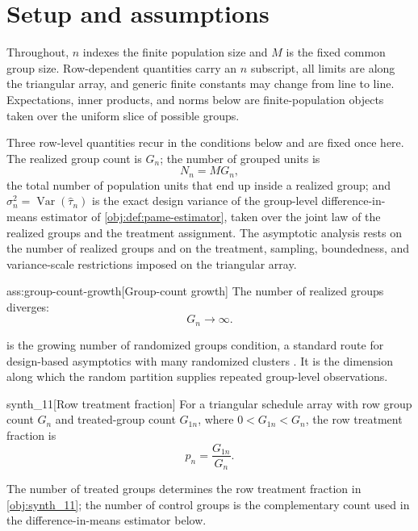 \section{Setup and assumptions}\label{sec:setup}

Throughout, \(n\) indexes the finite population size and \(M\) is the fixed common group size. Row-dependent quantities carry an \(n\) subscript, all limits are along the triangular array, and generic finite constants may change from line to line. Expectations, inner products, and norms below are finite-population objects taken over the uniform slice of possible groups.

Three row-level quantities recur in the conditions below and are fixed once here. The realized group count is \(G_n\); the number of grouped units is
\[
N_n=MG_n,
\]
the total number of population units that end up inside a realized group; and \(\sigma_n^2=\operatorname{Var}(\widehat\tau_n)\) is the exact design variance of the group-level difference-in-means estimator of \cref{obj:def:pame-estimator}, taken over the joint law of the realized groups and the treatment assignment. The asymptotic analysis rests on the number of realized groups and on the treatment, sampling, boundedness, and variance-scale restrictions imposed on the triangular array.

\begin{assumptionv}{ass:group-count-growth}[Group-count growth]
The number of realized groups diverges:
\[
G_n \to \infty .
\]
\end{assumptionv}

 is the growing number of randomized groups condition, a standard route for design-based asymptotics with many randomized clusters \citep{FuSamiiWang2026}. It is the dimension along which the random partition supplies repeated group-level observations.

\begin{definitionv}{synth_11}[Row treatment fraction]
For a triangular schedule array with row group count \(G_n\) and treated-group count \(G_{1n}\), where \(0<G_{1n}<G_n\), the row treatment fraction is
\[
p_n=\frac{G_{1n}}{G_n}.
\]
\end{definitionv}

The number of treated groups  determines the row treatment fraction in \cref{obj:synth_11}; the number of control groups  is the complementary count used in the difference-in-means estimator below.

